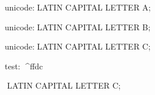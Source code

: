

unicode:^^^LATIN CAPITAL LETTER A;

unicode:^^^LATIN CAPITAL LETTER B;

unicode:^^^LATIN CAPITAL LETTER C;

test: ^^^^ffdc %


^^^LATIN CAPITAL LETTER C;
